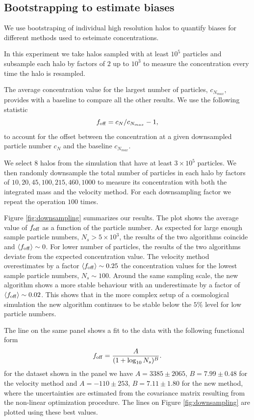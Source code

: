 \documentclass{emulateapj}
\begin{document}
\subsection{Bootstrapping to estimate biases}
\label{sec:bootstrapping}

We use bootstraping of individual high resolution halos to quantify
biases for different methods used to esteimate concentrations. 

In this experiment we take halos sampled with at least $10^{5}$
particles and subsample each halo by factors of $2$ up to $10^{3}$ to
measure the concentration every time the halo is resampled.

The average concentration value for the largest number of particles,
$c_{N_{max}}$, provides with a baseline to compare all the other
results.  
We use the following statistic
\begin{equation}
f_{\rm off} = c_{N} / c_{N_{max}} - 1,
\label{eq:f_off}
\end{equation}
to account for the offset between the concentration at a given
downsampled particle number $c_{N}$ and the baseline $c_{N_{max}}$.




We select $8$ halos from the simulation that have at
least $3\times 10^5$ particles.  
We then randomly downsample the total number of particles in each halo
by factors of $10, 20, 45, 100, 215, 460, 1000$ to measure its
concentration with both the integrated mass and the velocity
method. For each downsampling factor we repeat the operation $100$
times.  


Figure \ref{fig:downsampling} summarizes our results.  The plot shows
the average value of $f_{\rm off}$ as a function of the particle
number.  As expected for large enough sample particle numbers,
$N_{s}>5\times 10^3$, the results of the two algorithms coincide and
$\langle f_{\rm off}\rangle\sim 0$.  For lower number of particles,
the results of the two algorithms deviate from the expected
concentration value.  The velocity method overestimates by a factor
$\langle f_{\rm off}\rangle\sim 0.25$ the concentration values for the
lowest sample particle numbers, $N_{s}\sim 100$.  Around the same
sampling scale, the new algorithm shows a more stable behaviour with
an underestimate by a factor of $\langle f_{\rm off}\rangle \sim 0.02$.
This shows that in the more complex setup of a cosmological 
  simulation the new algorithm continues to be stable below the $5\%$
level for low particle numbers.

The line on the same panel shows a fit to the data with the following
functional form 
\begin{equation}
f_{\rm off} = \frac{A}{(1+\log_{10}N_s)^{B}}.
\label{eq:f_off_fit}
\end{equation} 
for the dataset shown in the panel we have $A=3385\pm 2065$, $B=7.99\pm0.48
$ for the velocity method and $A=-110\pm 253$, $B=7.11\pm1.80$ for the
new method, where the uncertainties are estimated from the covariance 
matrix resulting from the non-linear optimization procedure. The lines
on Figure \ref{fig:downsampling} are plotted using these best values. 
\end{document}
